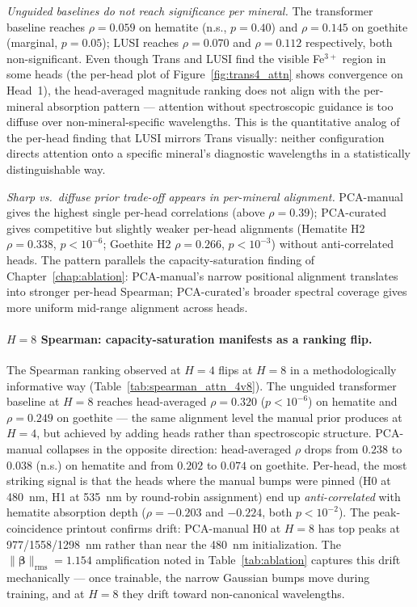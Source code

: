 \documentclass[11pt]{report}
\begin{document}
\emph{Unguided baselines do not reach significance per mineral.}
The transformer baseline reaches $\rho = 0.059$ on hematite (n.s., $p = 0.40$) and $\rho = 0.145$ on goethite (marginal, $p = 0.05$); LUSI reaches $\rho = 0.070$ and $\rho = 0.112$ respectively, both non-significant. Even though Trans and LUSI find the visible Fe$^{3+}$ region in some heads (the per-head plot of Figure~\ref{fig:trans4_attn} shows convergence on Head~1), the head-averaged magnitude ranking does not align with the per-mineral absorption pattern --- attention without spectroscopic guidance is too diffuse over non-mineral-specific wavelengths. This is the quantitative analog of the per-head finding that LUSI mirrors Trans visually: neither configuration directs attention onto a specific mineral's diagnostic wavelengths in a statistically distinguishable way.

\emph{Sharp vs.\ diffuse prior trade-off appears in per-mineral alignment.}
PCA-manual gives the highest single per-head correlations (above $\rho = 0.39$); PCA-curated gives competitive but slightly weaker per-head alignments (Hematite H2 $\rho = 0.338$, $p < 10^{-6}$; Goethite H2 $\rho = 0.266$, $p < 10^{-3}$) without anti-correlated heads. The pattern parallels the capacity-saturation finding of Chapter~\ref{chap:ablation}: PCA-manual's narrow positional alignment translates into stronger per-head Spearman; PCA-curated's broader spectral coverage gives more uniform mid-range alignment across heads.

\paragraph{$H = 8$ Spearman: capacity-saturation manifests as a ranking flip.}
The Spearman ranking observed at $H = 4$ flips at $H = 8$ in a methodologically informative way (Table~\ref{tab:spearman_attn_4v8}). The unguided transformer baseline at $H = 8$ reaches head-averaged $\rho = 0.320$ ($p < 10^{-6}$) on hematite and $\rho = 0.249$ on goethite --- the same alignment level the manual prior produces at $H = 4$, but achieved by adding heads rather than spectroscopic structure. PCA-manual collapses in the opposite direction: head-averaged $\rho$ drops from $0.238$ to $0.038$ (n.s.) on hematite and from $0.202$ to $0.074$ on goethite. Per-head, the most striking signal is that the heads where the manual bumps were pinned (H0 at 480~nm, H1 at 535~nm by round-robin assignment) end up \emph{anti-correlated} with hematite absorption depth ($\rho = -0.203$ and $-0.224$, both $p < 10^{-2}$). The peak-coincidence printout confirms drift: PCA-manual H0 at $H = 8$ has top peaks at 977/1558/1298~nm rather than near the 480~nm initialization. The $\|\bm{\beta}\|_{\text{rms}} = 1.154$ amplification noted in Table~\ref{tab:ablation} captures this drift mechanically --- once trainable, the narrow Gaussian bumps move during training, and at $H = 8$ they drift toward non-canonical wavelengths.
\end{document}
